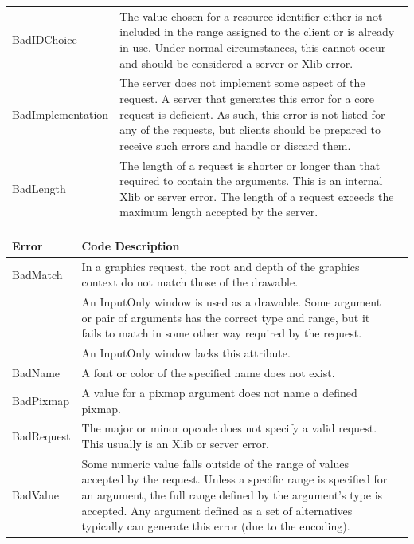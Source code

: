\documentclass{report}
\begin{document}
\begin{itemize}
\begin{center}
\begin{tabularx}{\textwidth}{@{}lX@{}}
                    BadIDChoice &The value chosen for a resource identifier either is not included in the range assigned to the client or is already in use. Under normal circumstances, this cannot occur and should be considered a server or Xlib error. \\[2ex]
                    BadImplementation &The server does not implement some aspect of the request. A server that generates this error for a core request is deficient. As such, this error is not listed for any of the requests, but clients should be prepared to receive such errors and handle or discard them. \\[2ex]
                    BadLength &The length of a request is shorter or longer than that required to contain the arguments. This is an internal Xlib or server error. The length of a request exceeds the maximum length accepted by the server. \\
                    \bottomrule
                \end{tabularx}
            \end{center}
            \bigbreak \noindent 
            \begin{center}
                \begin{tabularx}{\textwidth}{@{}lXl@{}}
                    \toprule
                    \textbf{Error}& \textbf{Code Description} \\
                    \midrule
                    BadMatch &In a graphics request, the root and depth of the graphics context do not match those of the drawable.\\[2ex]
                             &An InputOnly window is used as a drawable. Some argument or pair of arguments has the correct type and range, but it fails to match in some other way required by the request.\\[2ex]
                             &An InputOnly window lacks this attribute.\\[2ex]
                    BadName &A font or color of the specified name does not exist.\\[2ex]
                    BadPixmap &A value for a pixmap argument does not name a defined pixmap.\\[2ex]
                    BadRequest& The major or minor opcode does not specify a valid request. This usually is an Xlib or server error.\\[2ex]
                    BadValue &Some numeric value falls outside of the range of values accepted by the request. Unless a specific range is specified for an argument, the full range defined by the argument’s type is accepted. Any argument defined as a set of alternatives typically can generate this error (due to the encoding).\\[2ex]

\end{tabularx}
\end{center}
\end{itemize}
\end{document}

